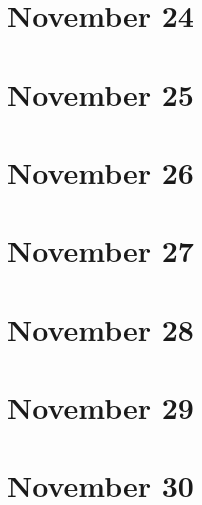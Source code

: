\section{November 24}

\section{November 25}

\section{November 26}

\section{November 27}

\section{November 28}

\section{November 29}

\section{November 30}

